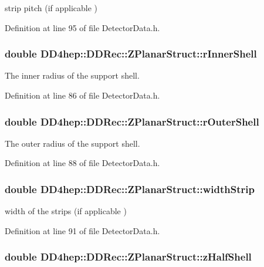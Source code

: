 strip pitch (if applicable ) 

Definition at line 95 of file DetectorData.h.\hypertarget{struct_d_d4hep_1_1_d_d_rec_1_1_z_planar_struct_a34989dd51686b6107bf9d322eabf76b0}{
\subsubsection[{rInnerShell}]{\setlength{\rightskip}{0pt plus 5cm}double {\bf DD4hep::DDRec::ZPlanarStruct::rInnerShell}}}
\label{struct_d_d4hep_1_1_d_d_rec_1_1_z_planar_struct_a34989dd51686b6107bf9d322eabf76b0}


The inner radius of the support shell. 

Definition at line 86 of file DetectorData.h.\hypertarget{struct_d_d4hep_1_1_d_d_rec_1_1_z_planar_struct_a298b12433c81ef9750730620293f7cfa}{
\subsubsection[{rOuterShell}]{\setlength{\rightskip}{0pt plus 5cm}double {\bf DD4hep::DDRec::ZPlanarStruct::rOuterShell}}}
\label{struct_d_d4hep_1_1_d_d_rec_1_1_z_planar_struct_a298b12433c81ef9750730620293f7cfa}


The outer radius of the support shell. 

Definition at line 88 of file DetectorData.h.\hypertarget{struct_d_d4hep_1_1_d_d_rec_1_1_z_planar_struct_af557ea4c315a65436763c0b2b91750ff}{
\subsubsection[{widthStrip}]{\setlength{\rightskip}{0pt plus 5cm}double {\bf DD4hep::DDRec::ZPlanarStruct::widthStrip}}}
\label{struct_d_d4hep_1_1_d_d_rec_1_1_z_planar_struct_af557ea4c315a65436763c0b2b91750ff}


width of the strips (if applicable ) 

Definition at line 91 of file DetectorData.h.\hypertarget{struct_d_d4hep_1_1_d_d_rec_1_1_z_planar_struct_acd368faf55766bd4b57296660458185c}{
\subsubsection[{zHalfShell}]{\setlength{\rightskip}{0pt plus 5cm}double {\bf DD4hep::DDRec::ZPlanarStruct::zHalfShell}}}
\label{struct_d_d4hep_1_1_d_d_rec_1_1_z_planar_struct_acd368faf55766bd4b57296660458185c}


